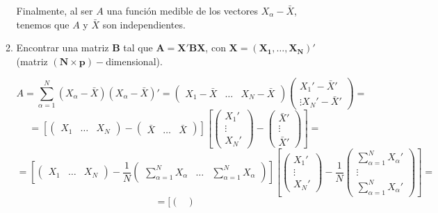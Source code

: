 \documentclass[11pt,a4paper]{article}
\begin{document}
\begin{enumerate}[label=\arabic*.]
\begin{enumerate}[label=(\alph*)]
Finalmente, al ser $A$ una función medible de los vectores $X_{\alpha} - \bar{X}$, tenemos que $A$ y $\bar{X}$ son independientes.

\vspace{1cm}
\bfseries
\item Encontrar una matriz $\mathbf{B}$ tal que $\mathbf{A = X'BX}$, con $\mathbf{X = (X_{1}, \dots, X_{N})'}$ \\ (matriz $\mathbf{(N \times p)-}$dimensional).

\vspace{0.5cm}
\normalfont

$$A = \sum_{\alpha=1}^{N} (X_{\alpha}-\bar{X})(X_{\alpha}-\bar{X})' = \begin{pmatrix}
X_{1} - \bar{X} & \dots & X_{N}-\bar{X}
\end{pmatrix} \begin{pmatrix}
X_{1}'-\bar{X}' \\ \vdots X_{N}'-\bar{X}'
\end{pmatrix} =$$
$$= [\begin{pmatrix}
X_{1} & \dots & X_{N}
\end{pmatrix} - \begin{pmatrix}
\bar{X} & \dots & \bar{X}
\end{pmatrix}] [\begin{pmatrix}
X_{1}' \\ \vdots \\ X_{N}'
\end{pmatrix} - \begin{pmatrix}
\bar{X}' \\ \vdots \\ \bar{X}'
\end{pmatrix}] =$$
$$= [\begin{pmatrix}
X_{1} & \dots & X_{N}
\end{pmatrix} - \frac{1}{N} \begin{pmatrix}
\sum_{\alpha=1}^{N}X_{\alpha} & \dots & \sum_{\alpha=1}^{N}X_{\alpha}
\end{pmatrix}] [\begin{pmatrix}
X_{1}' \\ \vdots \\ X_{N}'
\end{pmatrix} - \frac{1}{N} \begin{pmatrix}
\sum_{\alpha=1}^{N}X_{\alpha}' \\ \vdots \\ \sum_{\alpha=1}^{N}X_{\alpha}'
\end{pmatrix}] =$$
$$= [\begin{pmatrix}

\end{pmatrix}$$
\end{enumerate}
\end{enumerate}
\end{document}
